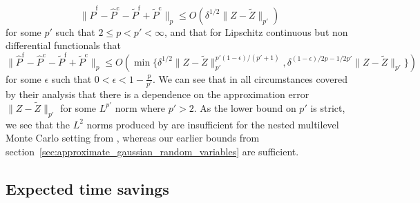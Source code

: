 \documentclass[manuscript,review]{acmart}
\begin{document}
\begin{equation*}
\lVert \hat{P}^{\mathrm{f}} - \hat{P}^{\mathrm{c}} - \tilde{P}^{\mathrm{f}} + \tilde{P}^{\mathrm{c}}\rVert_p 
\leq O(\delta^{1/2} \lVert Z - \tilde{Z} \rVert_{p'}) 
\end{equation*}
for some  $ p' $ such that $ 2 \leq p < p' < \infty $, and that for Lipschitz continuous but non differential functionals that 
\begin{equation*}
\lVert \hat{P}^{\mathrm{f}} - \hat{P}^{\mathrm{c}} - \tilde{P}^{\mathrm{f}} + \tilde{P}^{\mathrm{c}}\rVert_p 
\leq O(\min\{
\delta^{1/2} \lVert Z - \tilde{Z} \rVert_{p'}^{p'(1-\epsilon)/(p'+1)},
\delta^{(1-\epsilon)/2p -1/2p'}    \lVert Z - \tilde{Z} \rVert_{p'}
\})
\end{equation*}
for some  $ \epsilon $ such that $ 0<\epsilon<1 - \tfrac{p}{p'} $. We can see that in all circumstances covered by their analysis that there is a dependence on the approximation error $  \lVert Z - \tilde{Z} \rVert_{p'} $ for some $ L^{p'} $ norm where $ p' > 2 $. As the lower bound on $ p' $ is strict, we see that the $ L^2 $ norms produced by \citet{giles2019random_quadrature} are insufficient for the nested multilevel Monte Carlo setting from \citet{giles2020approximate}, whereas our earlier bounds from section~\ref{sec:approximate_gaussian_random_variables} are sufficient. 

\subsection{Expected time savings}
\end{document}
